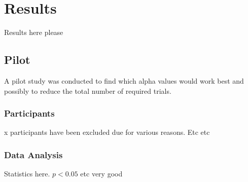 \documentclass[../main.tex]{subfiles}
\begin{document}
\section{Results}
Results here please

	\subsection{Pilot}
	A pilot study was conducted to find which alpha values would work best and possibly to reduce the total number of required trials.
	
	\subsubsection{Participants}
	x participants have been excluded due for various reasons. Etc etc

	\subsubsection{Data Analysis}
	Statistics here. $p < 0.05$ etc very good
\end{document}
